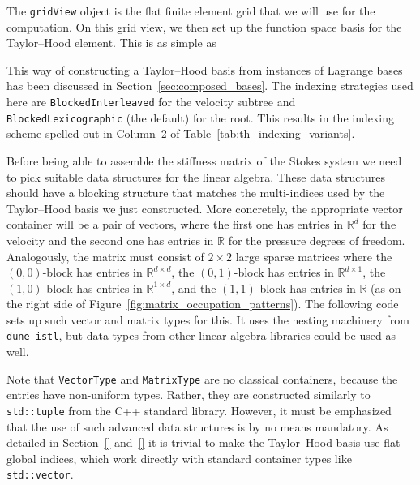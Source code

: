 \documentclass[a4paper,10pt,headings=normal,bibliography=totoc]{scrartcl}
\newcommand{\cpp}[1]{\lstinline[basicstyle=\ttfamily]!#1!}
\newcommand{\R}{\mathbb{R}}
\newcommand{\dunemodule}[1]{\texttt{#1}}
\begin{document}
%

%
%

%
The \cpp{gridView} object is the flat finite element grid that we will use for
the computation.
On this grid view, we then set up the function space basis for the Taylor--Hood element.  This is as simple as
%

%
This way of constructing a Taylor--Hood basis from instances of Lagrange bases
has been discussed in Section~\ref{sec:composed_bases}.  The indexing strategies
used here are \cpp{BlockedInterleaved} for the velocity subtree and \cpp{BlockedLexicographic}
(the default) for the root.  This results in the indexing scheme spelled out in
Column~2 of Table~\ref{tab:th_indexing_variants}.

Before being able to assemble the stiffness matrix of the Stokes system we need to pick suitable data structures
for the linear algebra.
These data structures should have a blocking structure that matches the multi-indices
used by the Taylor--Hood basis we just constructed.  More concretely,
the appropriate vector container will be a pair of vectors, where the first one
has entries in $\mathbb{R}^d$ for the velocity and the second one has entries in $\mathbb{R}$
for the pressure degrees of freedom.  Analogously, the matrix must consist of
$2 \times 2$ large sparse matrices where
the $(0,0)$-block has entries in $\R^{d\times d}$,
the $(0,1)$-block has entries in $\R^{d\times 1}$,
the $(1,0)$-block has entries in $\R^{1\times d}$,
and the $(1,1)$-block has entries in $\R$
(as on the right side of Figure~\ref{fig:matrix_occupation_patterns}).
The following code sets up such vector and matrix types for this.
It uses the nesting machinery from \dunemodule{dune-istl},
but data types from other linear algebra libraries could be used as well.
%

%
Note that \cpp{VectorType} and \cpp{MatrixType}
are no classical containers, because the entries have non-uniform types.
Rather, they are constructed similarly to \cpp{std::tuple} from the C++ standard library.
However, it must be emphasized that the use of such advanced data structures is by no
means mandatory. As detailed in Section~\ref{}
and~\ref{} it is trivial to make the Taylor--Hood basis
use flat global indices, which work directly with standard container types like \cpp{std::vector}.
\end{document}
